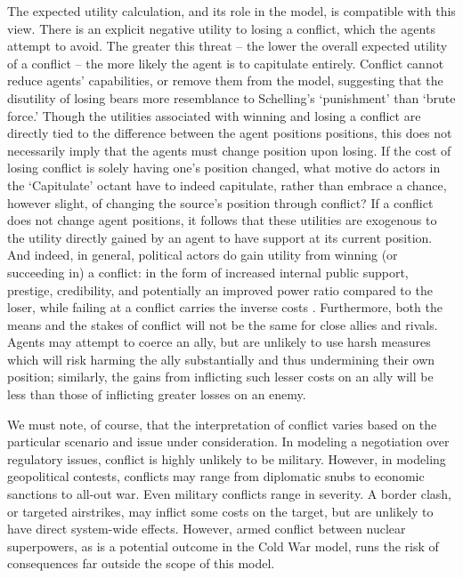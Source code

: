 The expected utility calculation, and its role in the model, is compatible with this view. There is an explicit negative utility to losing a conflict, which the agents attempt to avoid. The greater this threat -- the lower the overall expected utility of a conflict -- the more likely the agent is to capitulate entirely. Conflict cannot reduce agents' capabilities, or remove them from the model, suggesting that the disutility of losing bears more resemblance to Schelling's `punishment' than `brute force.' Though the utilities associated with winning and losing a conflict are directly tied to the difference between the agent positions positions, this does not necessarily imply that the agents must change position upon losing. If the cost of losing conflict is solely having one's position changed, what motive do actors in the `Capitulate' octant have to indeed capitulate, rather than embrace a chance, however slight, of changing the source's position through conflict? If a conflict does not change agent positions, it follows that these utilities are exogenous to the utility directly gained by an agent to have support at its current position. And indeed, in general, political actors do gain utility from winning (or succeeding in) a conflict: in the form of increased internal public support, prestige, credibility, and potentially an improved power ratio compared to the loser, while failing at a conflict carries the inverse costs \citep{bratton_2005}. Furthermore, both the means and the stakes of conflict will not be the same for close allies and rivals. Agents may attempt to coerce an ally, but are unlikely to use harsh measures which will risk harming the ally substantially and thus undermining their own position; similarly, the gains from inflicting such lesser costs on an ally will be less than those of inflicting greater losses on an enemy. 

We must note, of course, that the interpretation of conflict varies based on the particular scenario and issue under consideration. In modeling a negotiation over regulatory issues, conflict is highly unlikely to be military. However, in modeling geopolitical contests, conflicts may range from diplomatic snubs to economic sanctions to all-out war. Even military conflicts range in severity. A border clash, or targeted airstrikes, may inflict some costs on the target, but are unlikely to have direct system-wide effects. However, armed conflict between nuclear superpowers, as is a potential outcome in the \citet{bdm_1998} Cold War model, runs the risk of consequences far outside the scope of this model.

